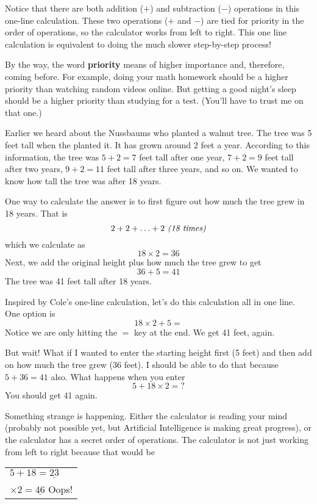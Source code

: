 Notice that there are both addition ($+$) and subtraction ($-$) operations in this one-line calculation.  These two operations ($+$ and $-$) are tied for priority in the order of operations, so the calculator works from left to right.  This one line calculation is equivalent to doing the much slower step-by-step process!

By the way, the word \textbf{priority} means of higher importance and, therefore, coming before.  For example, doing your math homework should be a higher priority than watching random videos online.  But getting a good night's sleep should be a higher priority than studying for a test. (You'll have to trust me on that one.)

Earlier we heard about the Nussbaums who planted a walnut tree.  The tree was 5 feet tall when the planted it.  It has grown around 2 feet a year.  According to this information, the tree was $5+2=7$ feet tall after one year, $7+2=9$ feet tall after two years, $9+2=11$ feet tall after three years, and so on.  We wanted to know how tall the tree was after 18 years.

One way to calculate the answer is to first figure out how much the tree grew in 18 years.  That is 
$$2+2+ \ldots + 2 \text{ \emph{(18 times)}}$$
which we calculate as 
$$18 \times 2 = 36$$
Next, we add the original height plus how much the tree grew to get
$$36+5=41$$
The tree was 41 feet tall after 18 years.

Inspired by Cole's one-line calculation, let's do this calculation all in one line.  One option is 
$$18 \times 2 + 5=$$ 
Notice we are only hitting the $=$ key at the end.  We get 41 feet, again.

But wait!  What if I wanted to enter the starting height first (5 feet) and then add on how much the tree grew (36 feet).  I should be able to do that because $5 + 36 = 41$ also.  What happens when you enter
$$5+18 \times 2=?$$
You should get 41 again.  

Something strange is happening.  Either the calculator is reading your mind (probably not possible yet, but Artificial Intelligence is making great progress), or the calculator has a secret order of operations.  The calculator is not just working from left to right because that would be

\begin{center}
\begin{tabular} {l}
$5+18=\underline{23}$ \\
\hspace{.15 in} $\times 2=\underline{46}$ Oops! \\
\end{tabular}
\end{center}

